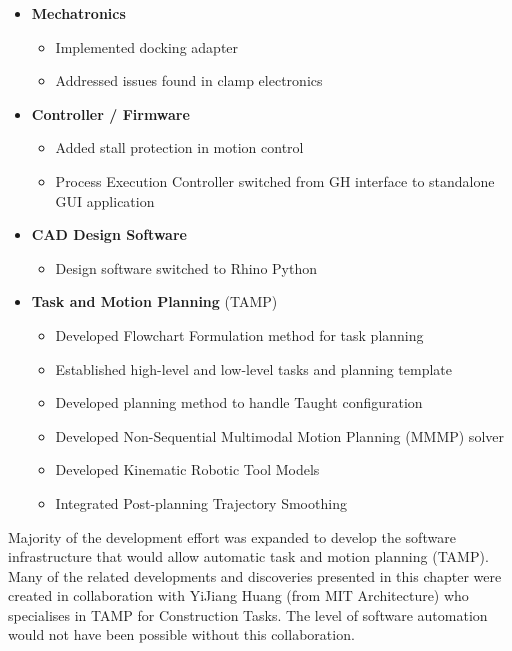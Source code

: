 \begin{itemize}
	\item \textbf{Mechatronics}

\begin{itemize}
	\item Implemented docking adapter

	\item Addressed issues found in clamp electronics

\end{itemize}
	\item \textbf{Controller / Firmware}

\begin{itemize}
	\item Added stall protection in motion control

	\item Process Execution Controller switched from GH interface to standalone GUI application

\end{itemize}
	\item \textbf{CAD Design Software}

\begin{itemize}
	\item Design software switched to Rhino Python

\end{itemize}
	\item \textbf{Task and Motion Planning }(TAMP)

\begin{itemize}
	\item Developed Flowchart Formulation method for task planning

	\item Established high-level and low-level tasks and planning template

	\item Developed planning method to handle Taught configuration

	\item Developed Non-Sequential Multimodal Motion Planning (MMMP) solver

	\item Developed Kinematic Robotic Tool Models

	\item Integrated Post-planning Trajectory Smoothing

\end{itemize}
\end{itemize}
Majority of the development effort was expanded to develop the software infrastructure that would allow automatic task and motion planning (TAMP). Many of the related developments and discoveries presented in this chapter were created in collaboration with YiJiang Huang (from MIT Architecture) who specialises in TAMP for Construction Tasks. The level of software automation would not have been possible without this collaboration.


